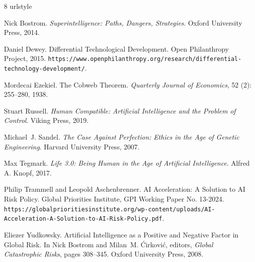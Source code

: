 \begin{thebibliography}{8}
\providecommand{\natexlab}[1]{#1}
\providecommand{\url}[1]{\texttt{#1}}
\expandafter\ifx\csname urlstyle\endcsname\relax
  \providecommand{\doi}[1]{doi: #1}\else
  \providecommand{\doi}{doi: \begingroup \urlstyle{rm}\Url}\fi

Nick Bostrom.
\newblock \emph{Superintelligence: Paths, Dangers, Strategies}.
\newblock Oxford University Press, 2014.

Daniel Dewey.
\newblock Differential Technological Development.
\newblock Open Philanthropy Project, 2015.
\newblock \url{https://www.openphilanthropy.org/research/differential-technology-development/}.

Mordecai Ezekiel.
\newblock The Cobweb Theorem.
\newblock \emph{Quarterly Journal of Economics}, 52 (2): 255--280, 1938.

Stuart Russell.
\newblock \emph{Human Compatible: Artificial Intelligence and the Problem of Control}.
\newblock Viking Press, 2019.

Michael~J. Sandel.
\newblock \emph{The Case Against Perfection: Ethics in the Age of Genetic Engineering}.
\newblock Harvard University Press, 2007.

Max Tegmark.
\newblock \emph{Life 3.0: Being Human in the Age of Artificial Intelligence}.
\newblock Alfred A. Knopf, 2017.

Philip Trammell and Leopold Aschenbrenner.
\newblock AI Acceleration: A Solution to AI Risk Policy.
\newblock Global Priorities Institute, GPI Working Paper No. 13-2024.
\newblock \url{https://globalprioritiesinstitute.org/wp-content/uploads/AI-Acceleration-A-Solution-to-AI-Risk-Policy.pdf}.

Eliezer Yudkowsky.
\newblock Artificial Intelligence as a Positive and Negative Factor in Global Risk.
\newblock In Nick Bostrom and Milan~M. Ćirković, editors, \emph{Global Catastrophic Risks}, pages 308--345. Oxford University Press, 2008.

\end{thebibliography}